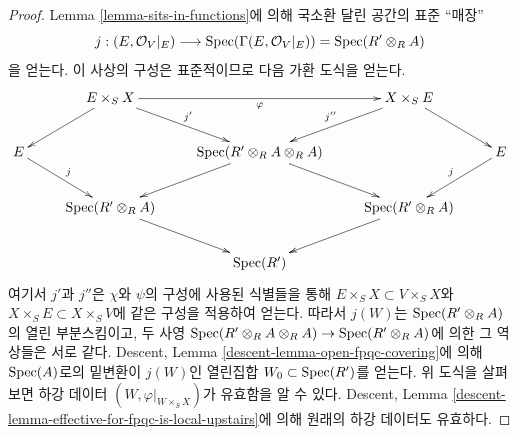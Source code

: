 \begin{proof}
\medskip\noindent
Lemma \ref{lemma-sits-in-functions}에 의해 국소환 달린 공간의 표준
``매장''
$$
j : (E, \mathcal{O}_V|_E) \longrightarrow
\mathop{\mathrm{Spec}}(\Gamma(E, \mathcal{O}_V|_E)) = \mathop{\mathrm{Spec}}(R' \otimes_R A)
$$
을 얻는다. 이 사상의 구성은 표준적이므로 다음 가환 도식을 얻는다.
$$
\xymatrix{
& E \times_S X \ar[rr]_\varphi \ar[ld] \ar[rd]^{j'} & &
X \times_S E \ar[rd] \ar[ld]_{j''} \\
E \ar[rd]^j  & &
\Spec(R' \otimes_R A \otimes_R A) \ar[ld] \ar[rd] & &
E \ar[ld]_j \\
& \Spec(R' \otimes_R A) \ar[rd] && \Spec(R' \otimes_R A) \ar[ld] \\
& & \Spec(R')
}
$$
여기서 $j'$과 $j''$은 $\chi$와 $\psi$의 구성에 사용된 식별들을 통해
$E \times_S X \subset V \times_S X$와
$X \times_S E \subset X \times_S V$에 같은 구성을 적용하여 얻는다.
따라서 $j(W)$는 $\mathop{\mathrm{Spec}}(R' \otimes_R A)$의 열린 부분스킴이고, 두 사영
$\mathop{\mathrm{Spec}}(R' \otimes_R A \otimes_R A) \to \mathop{\mathrm{Spec}}(R' \otimes_R A)$에 의한
그 역상들은 서로 같다. Descent, Lemma
\ref{descent-lemma-open-fpqc-covering}에 의해 $\mathop{\mathrm{Spec}}(A)$로의 밑변환이
$j(W)$인 열린집합 $W_0 \subset \mathop{\mathrm{Spec}}(R')$를 얻는다. 위 도식을 살펴보면
하강 데이터 $(W, \varphi|_{W \times_S X})$가 유효함을 알 수 있다.
Descent, Lemma
\ref{descent-lemma-effective-for-fpqc-is-local-upstairs}에 의해 원래의 하강
데이터도 유효하다.
\end{proof}












